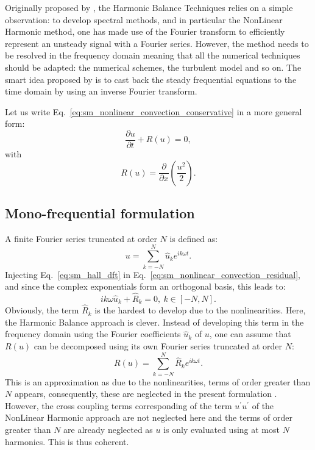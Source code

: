 
Originally proposed by \citet{Hall2002}, the Harmonic Balance Techniques
relies on a simple observation: to develop spectral methods, and in
particular the NonLinear Harmonic method, one has made use of the Fourier
transform to efficiently represent an unsteady signal with a Fourier series.
However, the method needs to be resolved in the frequency domain meaning
that all the numerical techniques should be adapted: the numerical schemes,
the turbulent model and so on. The smart idea 
proposed by \citet{Hall2002} is to
cast back the steady frequential equations to the time domain
by using an inverse Fourier transform.

Let us write Eq.~\ref{eq:sm_nonlinear_convection_conservative} 
in a more general form:
\begin{equation}
	\frac{\partial u}{\partial t} + R (u) = 0,
	\label{eq:sm_nonlinear_convection_residual}
\end{equation}
with
\begin{equation}
	R(u) = \frac{\partial}{\partial x} \left( 
	\frac{u^2}{2} \right).
\end{equation}

\subsection{Mono-frequential formulation}
A finite Fourier series truncated at order $N$ is defined as:
\begin{equation}
	u = \sum_{k=-N}^{N} 
	\widehat{u}_k e^{i k \omega t}.
	\label{eq:sm_hall_dft}
\end{equation}
Injecting Eq.~\ref{eq:sm_hall_dft} in 
Eq.~\ref{eq:sm_nonlinear_convection_residual}, and since
the complex exponentials form an orthogonal basis, 
this leads to:
\begin{equation}
	i k \omega \widehat{u}_k + \widehat{R}_k = 0, \: k \in [-N, N].
	\label{eq:sm_hall_frequential_eq}
\end{equation}
Obviously, the term $\widehat{R}_k$ is the hardest to develop
due to the nonlinearities. Here, the Harmonic Balance approach
is clever. 
Instead of developing this term in the frequency domain
using the Fourier coefficients $\widehat{u}_k$ of $u$,
one can assume that $R(u)$ can be decomposed using its own Fourier series
truncated at order $N$:
\begin{equation}
	R(u) = \sum_{k=-N}^{N} 
	\widehat{R}_k e^{i k \omega t}.
\end{equation}
This is an approximation as due to the nonlinearities, 
terms of order greater than $N$ appears, consequently, 
these are neglected in the present
formulation . However, the cross coupling terms corresponding
of the term $u^\prime u^\prime$ of the NonLinear Harmonic 
approach are not neglected here and
the terms of order greater
than $N$ are already neglected as $u$ is only evaluated using 
at most $N$ harmonics. This is thus coherent.

